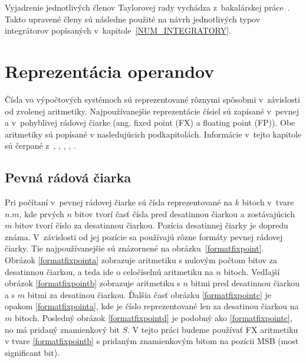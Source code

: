 Vyjadrenie jednotlivých členov Taylorovej rady vychádza z~bakalárskej práce~\cite{MatecnyBP}. Takto upravené členy sú následne použité na návrh jednotlivých typov integrátorov popísaných v~kapitole~\ref{NUM_INTEGRATORY}.



\chapter{Reprezentácia operandov} \label{REPREZENTACIA_OPERANDOV}
Čísla vo výpočtových systémoch sú reprezentované rôznymi spôsobmi v~závislosti od zvolenej aritmetiky. Najpoužívanejšie reprezentácie čísiel sú zapísané v~pevnej a v~pohyblivej rádovej čiarke (ang. fixed point (FX) a floating point (FP)). Obe aritmetiky sú popísané v nasledujúcich podkapitolách. Informácie v~tejto kapitole sú čerpané z~\cite{FXOnline}, \cite{FPOnline}, \cite{KrausDisP}, \cite{inpFP}, \cite{inpRepDat}.


\section{Pevná rádová čiarka}
Pri počítaní v~pevnej rádovej čiarke sú čísla reprezentované na $ k $ bitoch v~tvare $ n.m $, kde prvých $ n $ bitov tvorí časť čísla pred desatinnou čiarkou a zostávajúcich $ m $ bitov tvorí číslo za desatinnou čiarkou. Pozícia desatinnej čiarky je dopredu známa. V~závislosti od jej pozície sa používajú rôzne formáty pevnej rádovej čiarky. Tie najpoužívanejšie sú znázornené na obrázku~\ref{formatfixpoint}. \\
Obrázok \ref{formatfixpointa} zobrazuje aritmetiku s nulovým počtom bitov za desatinnou čiarkou, a teda ide o celočíselnú aritmetiku na $ n $ bitoch. Vedľajší obrázok \ref{formatfixpointb} zobrazuje aritmetiku s $ n $ bitmi pred desatinnou čiarkou a s $ m $ bitmi za desatinou čiarkou. Ďalšia časť obrázku \ref{formatfixpointc} je opakom \ref{formatfixpointa}, kde je číslo reprezentované len za desatinou čiarkou na $ m $ bitoch. Posledný obrázok \ref{formatfixpointd} je podobný ako \ref{formatfixpointc}, no má pridaný znamienkový bit $ S $.
V tejto práci budeme používať FX aritmetiku v tvare \ref{formatfixpointb} s pridaným znamienkovým bitom na pozícii MSB (most significant bit).


